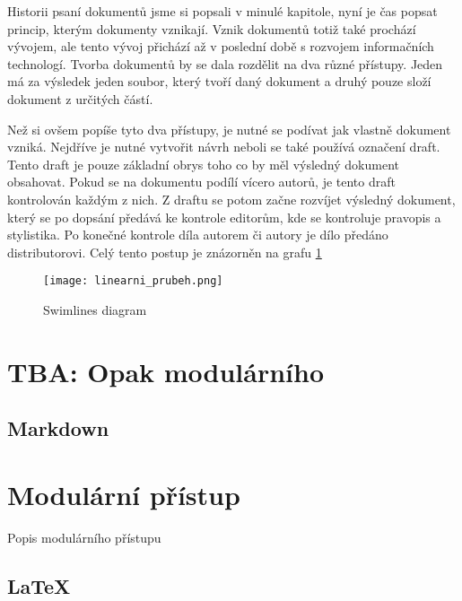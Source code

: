 Historii psaní dokumentů jsme si popsali v minulé kapitole, nyní je čas popsat princip, kterým dokumenty vznikají. Vznik dokumentů totiž také prochází
vývojem, ale tento vývoj přichází až v poslední době s rozvojem informačních technologí. Tvorba dokumentů by se dala rozdělit na dva různé přístupy.
Jeden má za výsledek jeden soubor, který tvoří daný dokument a druhý pouze složí dokument z určitých částí.

Než si ovšem popíše tyto dva přístupy, je nutné se podívat jak vlastně dokument vzniká. Nejdříve je nutné vytvořit návrh neboli se také používá
označení draft. Tento draft je pouze základní obrys toho co by měl výsledný dokument obsahovat. Pokud se na dokumentu podílí vícero autorů, je
tento draft kontrolován každým z nich. Z draftu se potom začne rozvíjet výsledný dokument, který se po dopsání předává ke kontrole editorům,
kde se kontroluje pravopis a stylistika. Po konečné kontrole díla autorem či autory je dílo předáno distributorovi. Celý tento postup
je znázorněn na grafu \ref{fig:linflow}

\begin{figure}[h]
    \centering
    \texttt{[image: linearni\_prubeh.png]}
    \caption{Swimlines diagram}
    \label{fig:linflow}
\end{figure}

\section{TBA: Opak modulárního}

\subsection{Markdown}

\section{Modulární přístup}

Popis modulárního přístupu

\subsection{\LaTeX}
